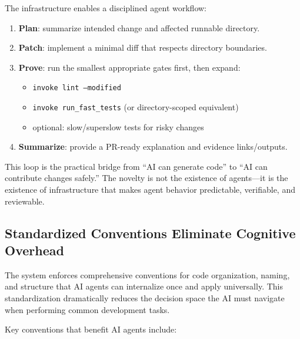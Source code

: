 The infrastructure enables a disciplined agent workflow:
\begin{enumerate}
  \item \textbf{Plan}: summarize intended change and affected runnable directory.
  \item \textbf{Patch}: implement a minimal diff that respects directory boundaries.
  \item \textbf{Prove}: run the smallest appropriate gates first, then expand:
    \begin{itemize}
      \item \texttt{invoke lint --modified}
      \item \texttt{invoke run\_fast\_tests} (or directory-scoped equivalent)
      \item optional: slow/superslow tests for risky changes
    \end{itemize}
  \item \textbf{Summarize}: provide a PR-ready explanation and evidence links/outputs.
\end{enumerate}

This loop is the practical bridge from “AI can generate code” to “AI can contribute
changes safely.” The novelty is not the existence of agents—it is the existence of
infrastructure that makes agent behavior predictable, verifiable, and reviewable.

\subsection{Standardized Conventions Eliminate Cognitive Overhead}

The system enforces comprehensive conventions for code organization,
naming, and structure that AI agents can internalize once and apply
universally. This standardization dramatically reduces the decision
space the AI must navigate when performing common development tasks.

Key conventions that benefit AI agents include:

